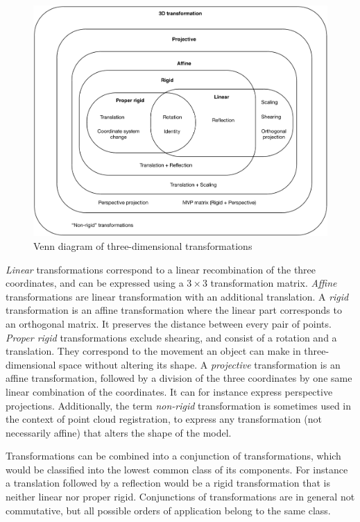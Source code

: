 \begin{figure}[h]
\center
\includegraphics[width=.8\textwidth]{fig/transformations_venn.pdf}
\caption{Venn diagram of three-dimensional transformations}
\end{figure}

\emph{Linear} transformations correspond to a linear recombination of the three coordinates, and can be expressed using a $3 \times 3$ transformation matrix. \emph{Affine} transformations are linear transformation with an additional translation. A \emph{rigid} transformation is an affine transformation where the linear part corresponds to an orthogonal matrix. It preserves the distance between every pair of points. \emph{Proper rigid} transformations exclude shearing, and consist of a rotation and a translation. They correspond to the movement an object can make in three-dimensional space without altering its shape. A \emph{projective} transformation is an affine transformation, followed by a division of the three coordinates by one same linear combination of the coordinates. It can for instance express perspective projections. Additionally, the term \emph{non-rigid} transformation is sometimes used in the context of point cloud registration, to express any transformation (not necessarily affine) that alters the shape of the model.

Transformations can be combined into a conjunction of transformations, which would be classified into the lowest common class of its components. For instance a translation followed by a reflection would be a rigid transformation that is neither linear nor proper rigid. Conjunctions of transformations are in general not commutative, but all possible orders of application belong to the same class.

